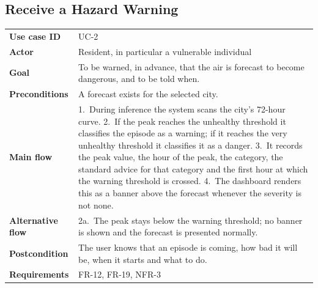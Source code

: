 \subsection{Receive a Hazard Warning}
\begin{xltabular}{\textwidth}{Q{2.9cm} Y}
\toprule
\bfseries Use case ID & UC-2 \\
\bfseries Actor & Resident, in particular a vulnerable individual \\
\bfseries Goal & To be warned, in advance, that the air is forecast to become
dangerous, and to be told when. \\
\bfseries Preconditions & A forecast exists for the selected city. \\
\bfseries Main flow & 1.~During inference the system scans the city's 72-hour
curve. 2.~If the peak reaches the unhealthy threshold it classifies the episode
as a warning; if it reaches the very unhealthy threshold it classifies it as a
danger. 3.~It records the peak value, the hour of the peak, the category, the
standard advice for that category and the first hour at which the warning
threshold is crossed. 4.~The dashboard renders this as a banner above the
forecast whenever the severity is not none. \\
\bfseries Alternative flow & 2a.~The peak stays below the warning threshold; no
banner is shown and the forecast is presented normally. \\
\bfseries Postcondition & The user knows that an episode is coming, how bad it
will be, when it starts and what to do. \\
\bfseries Requirements & FR-12, FR-19, NFR-3 \\
\bottomrule
\end{xltabular}


